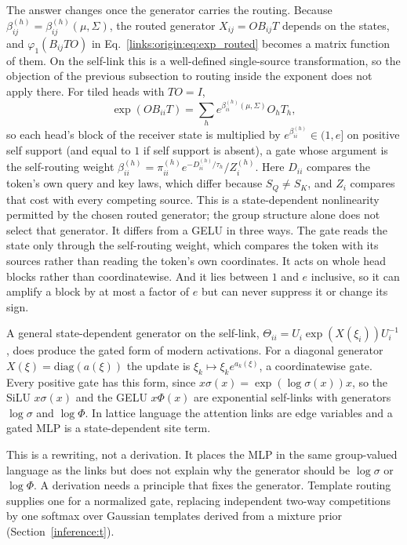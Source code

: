 \documentclass[11pt]{article}
\theoremstyle{definition}
\theoremstyle{remark}
\begin{document}
The answer changes once the generator carries the routing. Because $\beta_{ij}^{(h)}=\beta_{ij}^{(h)}(\mu,\Sigma)$, the routed generator $X_{ij}=OB_{ij}T$ depends on the states, and $\varphi_1(B_{ij}TO)$ in Eq.~\eqref{links:origin:eq:exp_routed} becomes a matrix function of them. On the self-link this is a well-defined single-source transformation, so the objection of the previous subsection to routing inside the exponent does not apply there. For tiled heads with $TO=I$,
\begin{equation}
\exp(OB_{ii}T)=\sum_he^{\beta_{ii}^{(h)}(\mu,\Sigma)}O_hT_h,
\label{links:origin:eq:self_gate}
\end{equation}
so each head's block of the receiver state is multiplied by $e^{\beta_{ii}^{(h)}}\in(1,e]$ on positive self support (and equal to $1$ if self support is absent), a gate whose argument is the self-routing weight $\beta_{ii}^{(h)}=\pi_{ii}^{(h)}e^{-D_{ii}^{(h)}/\tau_h}/Z_i^{(h)}$. Here $D_{ii}$ compares the token's own query and key laws, which differ because $S_Q\ne S_K$, and $Z_i$ compares that cost with every competing source. This is a state-dependent nonlinearity permitted by the chosen routed generator; the group structure alone does not select that generator. It differs from a GELU in three ways. The gate reads the state only through the self-routing weight, which compares the token with its sources rather than reading the token's own coordinates. It acts on whole head blocks rather than coordinatewise. And it lies between $1$ and $e$ inclusive, so it can amplify a block by at most a factor of $e$ but can never suppress it or change its sign.

A general state-dependent generator on the self-link, $\Theta_{ii}=U_i\exp(X(\xi_i))U_i^{-1}$, does produce the gated form of modern activations. For a diagonal generator $X(\xi)=\mathrm{diag}(a(\xi))$ the update is $\xi_k\mapsto\xi_ke^{a_k(\xi)}$, a coordinatewise gate. Every positive gate has this form, since $x\sigma(x)=\exp(\log\sigma(x))x$, so the SiLU $x\sigma(x)$ \cite{links:elfwing2018silu} and the GELU $x\Phi(x)$ \cite{links:hendrycks2016gelu} are exponential self-links with generators $\log\sigma$ and $\log\Phi$. In lattice language the attention links are edge variables and a gated MLP is a state-dependent site term.

This is a rewriting, not a derivation. It places the MLP in the same group-valued language as the links but does not explain why the generator should be $\log\sigma$ or $\log\Phi$. A derivation needs a principle that fixes the generator. Template routing supplies one for a normalized gate, replacing independent two-way competitions by one softmax over Gaussian templates derived from a mixture prior (Section~\ref{inference:t}).
\end{document}
